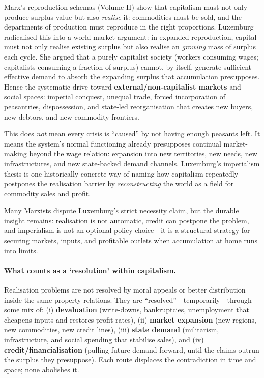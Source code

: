 Marx’s reproduction schemas (Volume II) show that capitalism must not only produce surplus value
but also \emph{realise} it: commodities must be sold, and the departments of production must
reproduce in the right proportions.
Luxemburg radicalised this into a world-market argument: in expanded reproduction, capital must
not only realise existing surplus but also realise an \emph{growing} mass of surplus each cycle.
She argued that a purely capitalist society (workers consuming wages; capitalists consuming a fraction
of surplus) cannot, by itself, generate sufficient effective demand to absorb the expanding surplus that
accumulation presupposes.
Hence the systematic drive toward \textbf{external/non-capitalist markets} and social spaces:
imperial conquest, unequal trade, forced incorporation of peasantries, dispossession, and
state-led reorganisation that creates new buyers, new debtors, and new commodity frontiers.\cite{Luxemburg1913}

This does \emph{not} mean every crisis is “caused” by not having enough peasants left.
It means the system’s normal functioning already presupposes continual market-making beyond the wage
relation: expansion into new territories, new needs, new infrastructures, and new state-backed demand
channels.
Luxemburg’s imperialism thesis is one historically concrete way of naming how capitalism repeatedly
postpones the realisation barrier by \emph{reconstructing} the world as a field for commodity sales and profit.

Many Marxists dispute Luxemburg’s strict necessity claim, but the durable insight remains:
realisation is not automatic, credit can postpone the problem, and imperialism is not an optional
policy choice---it is a structural strategy for securing markets, inputs, and profitable outlets
when accumulation at home runs into limits.

\paragraph{What counts as a `resolution' within capitalism.}
Realisation problems are not resolved by moral appeals or better distribution inside the same property
relations.
They are “resolved”---temporarily---through some mix of:
(i) \textbf{devaluation} (write-downs, bankruptcies, unemployment that cheapens inputs and restores profit rates),
(ii) \textbf{market expansion} (new regions, new commodities, new credit lines),
(iii) \textbf{state demand} (militarism, infrastructure, and social spending that stabilise sales), and
(iv) \textbf{credit/financialisation} (pulling future demand forward, until the claims outrun the surplus they presuppose).
Each route displaces the contradiction in time and space; none abolishes it.

